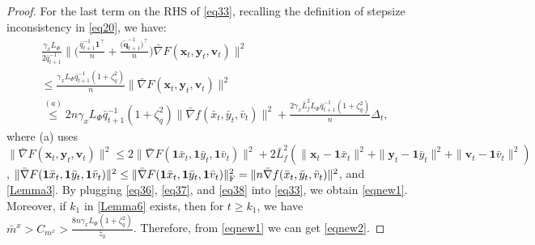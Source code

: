 \documentclass{article}
\theoremstyle{plain}
\theoremstyle{definition}
\theoremstyle{remark}
\begin{document}
\begin{proof}
For the last term on the RHS of \cref{eq33}, recalling the definition of stepsize inconsistency in \cref{eq20}, we have:
\begin{align}
&\frac{\gamma_x L_\Phi}{2\bar{q}_{t+1}^{-1}}  \bigg\|\bigg(\frac{\bar{q}_{t+1}^{-1}\mathbf{1}^\top}{n} 
+ \frac{\big(\tilde{\mathbf{q}}_{t+1}^{-1}\big)^\top}{n} \bigg)\bar{\nabla} F(\mathbf{x}_t, \mathbf{y}_t, \mathbf{v}_t)\bigg\|^2 \nonumber\\
&\leq \frac{\gamma_x L_\Phi \bar{q}_{t+1}^{-1} \left(1 +\zeta_q^2\right)}{n} \|\bar{\nabla} F(\mathbf{x}_t, \mathbf{y}_t, \mathbf{v}_t)\|^2\nonumber\\
&\overset{(a)}{\leq} {2n\gamma_x L_\Phi \bar{q}_{t+1}^{-1} \left(1 +\zeta_q^2\right)} \|\bar{\nabla} f(\bar{x}_t, \bar{y}_t, \bar{v}_t)\|^2+\frac{2\gamma_x \bar{L}_{f}^2 L_\Phi\bar{q}_{t+1}^{-1} \left(1 +\zeta_q^2\right)}{n}\Delta_t,\label{eq38} 
\end{align}
where (a) uses $ \|\bar{\nabla} F(\mathbf{x}_t, \mathbf{y}_t, \mathbf{v}_t)\|^2\leq 2\|\bar{\nabla} F(\mathbf{1}\bar{x}_t, \mathbf{1}\bar{y}_t, \mathbf{1}\bar{v}_t)\|^2 + 2\bar{L}_{f}^2 (\|\mathbf{x}_t - \mathbf{1}\bar{x}_t\|^2 + \|\mathbf{y}_t - \mathbf{1}\bar{y}_t\|^2+ \|\mathbf{v}_t - \mathbf{1}\bar{v}_t\|^2)$, $\|\bar{\nabla} F(\mathbf{1}\bar{x}_t, \mathbf{1}\bar{y}_t, \mathbf{1}\bar{v}_t)\|^2 \leq\|\bar{\nabla} F(\mathbf{1}\bar{x}_t, \mathbf{1}\bar{y}_t, \mathbf{1}\bar{v}_t)\|_{\rm F}^2=\|n\bar{\nabla} f(\bar{x}_t,\bar{y}_t,\bar{v}_t)\|^2$, and \cref{Lemma3}. By plugging \cref{eq36}, \cref{eq37}, and \cref{eq38} into \cref{eq33}, we obtain \cref{eqnew1}. Moreover, if $k_1$ in \cref{Lemma6} exists, then for $t\geq k_1$, we have $\bar{m}^x>C_{m^x}>\frac{8n\gamma_x L_\Phi \left(1 +\zeta_q^2\right)}{\bar{z}_0}$. Therefore, from \cref{eqnew1} we can get \cref{eqnew2}. 
\end{proof}
\end{document}
